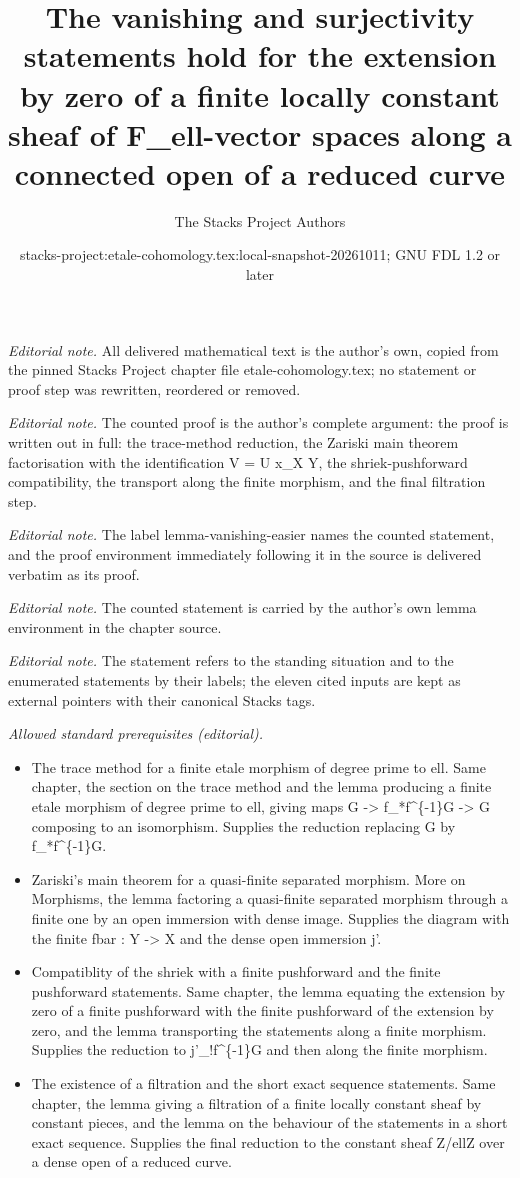 \documentclass[10pt,a4paper]{amsart}
\title{The vanishing and surjectivity statements hold for the extension by zero of a finite locally constant sheaf of F\_ell-vector spaces along a connected open of a reduced curve}
\author{The Stacks Project Authors}
\date{stacks-project:etale-cohomology.tex:local-snapshot-20261011; GNU FDL 1.2 or later}
\theoremstyle{plain}
\theoremstyle{definition}
\theoremstyle{remark}
\numberwithin{equation}{subsection}
\begin{document}
\maketitle
\noindent\textit{Editorial note.} All delivered mathematical text is the author's own, copied from the pinned Stacks Project chapter file etale-cohomology.tex; no statement or proof step was rewritten, reordered or removed.\par\medskip
\noindent\textit{Editorial note.} The counted proof is the author's complete argument: the proof is written out in full: the trace-method reduction, the Zariski main theorem factorisation with the identification V = U x\_X Y, the shriek-pushforward compatibility, the transport along the finite morphism, and the final filtration step.\par\medskip
\noindent\textit{Editorial note.} The label lemma-vanishing-easier names the counted statement, and the proof environment immediately following it in the source is delivered verbatim as its proof.\par\medskip
\noindent\textit{Editorial note.} The counted statement is carried by the author's own lemma environment in the chapter source.\par\medskip
\noindent\textit{Editorial note.} The statement refers to the standing situation and to the enumerated statements by their labels; the eleven cited inputs are kept as external pointers with their canonical Stacks tags.\par\medskip
\noindent\textit{Allowed standard prerequisites (editorial).}\begin{itemize}
\item The trace method for a finite etale morphism of degree prime to ell. Same chapter, the section on the trace method and the lemma producing a finite etale morphism of degree prime to ell, giving maps G -> f\_*f\textasciicircum{}\{-1\}G -> G composing to an isomorphism. Supplies the reduction replacing G by f\_*f\textasciicircum{}\{-1\}G.
\item Zariski's main theorem for a quasi-finite separated morphism. More on Morphisms, the lemma factoring a quasi-finite separated morphism through a finite one by an open immersion with dense image. Supplies the diagram with the finite fbar : Y -> X and the dense open immersion j'.
\item Compatiblity of the shriek with a finite pushforward and the finite pushforward statements. Same chapter, the lemma equating the extension by zero of a finite pushforward with the finite pushforward of the extension by zero, and the lemma transporting the statements along a finite morphism. Supplies the reduction to j'\_!f\textasciicircum{}\{-1\}G and then along the finite morphism.
\item The existence of a filtration and the short exact sequence statements. Same chapter, the lemma giving a filtration of a finite locally constant sheaf by constant pieces, and the lemma on the behaviour of the statements in a short exact sequence. Supplies the final reduction to the constant sheaf Z/ellZ over a dense open of a reduced curve.
\end{itemize}\medskip
\end{document}
